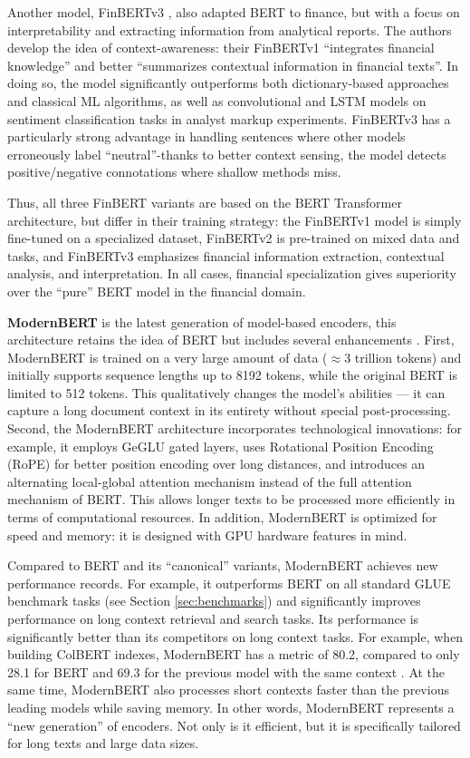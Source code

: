 Another model, FinBERTv3 \parencite{Yang2020FinBERT, Huang2023FinBERT}, also adapted BERT to finance, but with a focus
on interpretability and extracting information from analytical reports. The authors develop the idea
of context-awareness: their FinBERTv1 “integrates financial knowledge” and better “summarizes contextual
information in financial texts”. In doing so, the model significantly outperforms both dictionary-based
approaches and classical ML algorithms, as well as convolutional and LSTM models on sentiment classification
tasks in analyst markup experiments. FinBERTv3 \parencite{Yang2020FinBERT} has a particularly strong
advantage in handling sentences where other models erroneously label “neutral”-thanks to better
context sensing, the model detects positive/negative connotations where shallow methods miss.

Thus, all three FinBERT variants are based on the BERT Transformer architecture, but differ in their training
strategy: the FinBERTv1 model is simply fine-tuned on a specialized dataset, FinBERTv2 is pre-trained on mixed
data and tasks, and FinBERTv3 emphasizes financial information extraction, contextual analysis, and interpretation.
In all cases, financial specialization gives superiority over the “pure” BERT model in the financial domain.

\textbf{ModernBERT} is the latest generation of model-based encoders, this architecture retains the idea of BERT but
includes several enhancements \parencite{Warner2024ModernBERT}. First, ModernBERT is trained on a very large amount of data ($\approx$3 trillion
tokens) and initially supports sequence lengths up to 8192 tokens, while the original BERT is limited to 512
tokens. This qualitatively changes the model's abilities --- it can capture a long document context in its
entirety without special post-processing. Second, the ModernBERT architecture incorporates technological
innovations: for example, it employs GeGLU gated layers, uses Rotational Position Encoding (RoPE) for better
position encoding over long distances, and introduces an alternating local-global attention mechanism instead
of the full attention mechanism of BERT. This allows longer texts to be processed more efficiently in terms
of computational resources. In addition, ModernBERT is optimized for speed and memory: it is designed with GPU
hardware features in mind.

Compared to BERT and its “canonical” variants, ModernBERT achieves new performance records. For example,
it outperforms BERT on all standard GLUE benchmark tasks (see Section \ref{sec:benchmarks}) and significantly
improves performance on long context retrieval and search tasks. Its performance is significantly better than
its competitors on long context tasks. For example, when building ColBERT indexes, ModernBERT has a metric
of 80.2, compared to only 28.1 for BERT and 69.3 for the previous model with the same context
\parencite{Warner2024ModernBERT,devlin2019BERT}. At the same time, ModernBERT also processes short contexts
faster than the previous leading models while saving memory. In other words, ModernBERT represents
a “new generation” of encoders. Not only is it efficient, but it is specifically tailored for long texts
and large data sizes.

